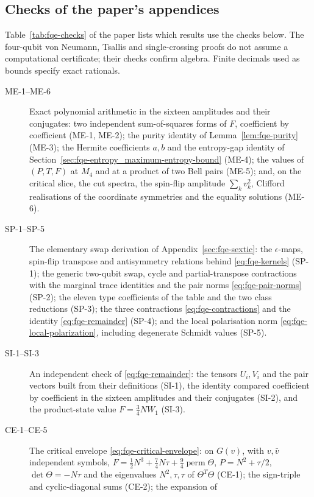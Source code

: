 \subsection{Checks of the paper's appendices}\label{sec:sup-paper-checks}
Table~\ref{tab:fqe-checks} of the paper lists which results use the checks below. The four-qubit von Neumann, Tsallis and
single-crossing proofs do not assume a computational certificate; their checks confirm algebra. Finite decimals used as
bounds specify exact rationals.
\begin{description}
\item[ME-1--ME-6] Exact polynomial arithmetic in the sixteen amplitudes and their conjugates: two
independent sum-of-squares forms of $F$, coefficient by
coefficient (ME-1, ME-2); the purity identity of Lemma~\ref{lem:fqe-purity} (ME-3); the Hermite
coefficients $a,b$ and the entropy-gap identity of Section~\ref{sec:fqe-entropy_maximum-entropy-bound} (ME-4);
the values of $(P,T,F)$ at $M_4$ and at a product of two Bell pairs (ME-5); and, on the critical slice,
the cut spectra, the spin-flip amplitude $\sum_kv_k^2$, Clifford realisations of the coordinate
symmetries and the equality solutions (ME-6).
\item[SP-1--SP-5] The elementary swap derivation of Appendix~\ref{sec:fqe-sextic}: the $\epsilon$-maps,
spin-flip transpose and antisymmetry relations behind \eqref{eq:fqe-kernels} (SP-1); the generic
two-qubit swap, cycle and partial-transpose contractions with the marginal trace identities and the pair norms
\eqref{eq:fqe-pair-norms} (SP-2);
the eleven type coefficients of the table and the two class reductions (SP-3); the three contractions
\eqref{eq:fqe-contractions} and the identity \eqref{eq:fqe-remainder} (SP-4); and the local polarisation norm
\eqref{eq:fqe-local-polarization}, including degenerate Schmidt values (SP-5).
\item[SI-1--SI-3] An independent check of \eqref{eq:fqe-remainder}: the tensors $U_i,V_i$ and the pair vectors built
from their definitions (SI-1), the identity compared coefficient by coefficient in the sixteen amplitudes and their
conjugates (SI-2), and the product-state value $F=\tfrac34NW_1$ (SI-3).
\item[CE-1--CE-5] The critical envelope \eqref{eq:fqe-critical-envelope}: on $G(v)$, with $v,\bar v$ independent symbols,
$F=\tfrac12N^3+\tfrac74N\tau+\tfrac94\operatorname{perm}\Theta$, $P=N^2+\tau/2$, $\det\Theta=-N\tau$ and the eigenvalues
$N^2,\tau,\tau$ of $\Theta^T\Theta$ (CE-1); the sign-triple and cyclic-diagonal sums (CE-2); the expansion of

\end{description}
